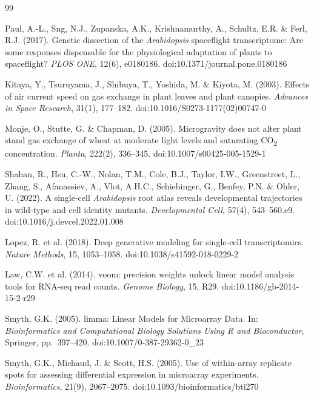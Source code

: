 \documentclass[11pt,a4paper]{article}
\begin{document}
\begin{thebibliography}{99}

Paul, A.-L., Sng, N.J., Zupanska, A.K., Krishnamurthy, A., Schultz, E.R. \& Ferl, R.J. (2017). Genetic dissection of the \textit{Arabidopsis} spaceflight transcriptome: Are some responses dispensable for the physiological adaptation of plants to spaceflight? \textit{PLOS ONE}, 12(6), e0180186. doi:10.1371/journal.pone.0180186

Kitaya, Y., Tsuruyama, J., Shibuya, T., Yoshida, M. \& Kiyota, M. (2003). Effects of air current speed on gas exchange in plant leaves and plant canopies. \textit{Advances in Space Research}, 31(1), 177--182. doi:10.1016/S0273-1177(02)00747-0

Monje, O., Stutte, G. \& Chapman, D. (2005). Microgravity does not alter plant stand gas exchange of wheat at moderate light levels and saturating CO\textsubscript{2} concentration. \textit{Planta}, 222(2), 336--345. doi:10.1007/s00425-005-1529-1

Shahan, R., Hsu, C.-W., Nolan, T.M., Cole, B.J., Taylor, I.W., Greenstreet, L., Zhang, S., Afanassiev, A., Vlot, A.H.C., Schiebinger, G., Benfey, P.N. \& Ohler, U. (2022). A single-cell \textit{Arabidopsis} root atlas reveals developmental trajectories in wild-type and cell identity mutants. \textit{Developmental Cell}, 57(4), 543--560.e9. doi:10.1016/j.devcel.2022.01.008

Lopez, R. et al. (2018). Deep generative modeling for single-cell transcriptomics. \textit{Nature Methods}, 15, 1053--1058. doi:10.1038/s41592-018-0229-2

Law, C.W. et al. (2014). voom: precision weights unlock linear model analysis tools for RNA-seq read counts. \textit{Genome Biology}, 15, R29. doi:10.1186/gb-2014-15-2-r29

Smyth, G.K. (2005). limma: Linear Models for Microarray Data. In: \textit{Bioinformatics and Computational Biology Solutions Using R and Bioconductor}, Springer, pp.~397--420. doi:10.1007/0-387-29362-0\_23

Smyth, G.K., Michaud, J. \& Scott, H.S. (2005). Use of within-array replicate spots for assessing differential expression in microarray experiments. \textit{Bioinformatics}, 21(9), 2067--2075. doi:10.1093/bioinformatics/bti270


\end{thebibliography}
\end{document}

